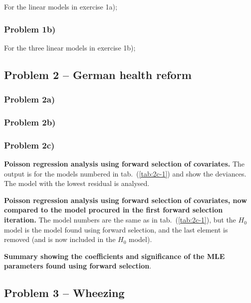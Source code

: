 \documentclass[a4paper,11pt]{article}
\begin{document}
For the linear models in exercise 1a);
{\footnotesize
    
}

\subsubsection{Problem 1b)}
\label{app:1b}

For the three linear models in exercise 1b);
{\footnotesize
    
}

\subsection{Problem 2 -- German health reform}
\label{app:2}

\subsubsection{Problem 2a)}
\label{app:2a}
{\footnotesize
    
}

\subsubsection{Problem 2b)}
\label{app:2b}
{\footnotesize
    
}

\subsubsection{Problem 2c)}
\label{app:2c}
\textbf{Poisson regression analysis using forward selection of covariates.} The output is for the models numbered in tab.~(\ref{tab:2c-1}) and show the deviances. The model with the lowest residual is analysed.
{\footnotesize
    
}
\textbf{Poisson regression analysis using forward selection of covariates, now compared to the model procured in the first forward selection iteration.} The model numbers are the same as in tab.~(\ref{tab:2c-1}), but the $H_0$ model is the model found using forward selection, and the last element is removed (and is now included in the $H_0$ model).
{\footnotesize
    
}

\textbf{Summary showing the coefficients and significance of the MLE parameters found using forward selection}.
{\footnotesize
    
}


\subsection{Problem 3 -- Wheezing}
\label{app:3}
\end{document}
